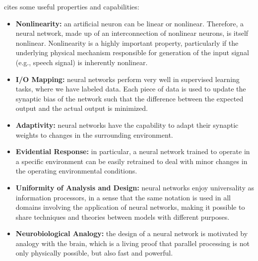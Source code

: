 \cite{haykin2009neural} cites some useful properties and capabilities:
\begin{itemize}
    \item \textbf{Nonlinearity:} an artificial neuron can be linear or nonlinear. Therefore, a neural network, made up of an interconnection of nonlinear neurons, is itself nonlinear. Nonlinearity is a highly important property, particularly if the underlying physical mechanism responsible for generation of the input signal (e.g., speech signal) is inherently nonlinear.
    \item \textbf{I/O Mapping:} neural networks perform very well in supervised learning tasks, where we have labeled data. Each piece of data is used to update the synaptic bias of the network such that the difference between the expected output and the actual output is minimized.
    \item \textbf{Adaptivity:} neural networks have the capability to adapt their synaptic weights to changes in the surrounding environment. 
    \item \textbf{Evidential Response:} in particular, a neural network trained to operate in a specific environment can be easily retrained to deal with minor changes in the operating environmental conditions.
    \item \textbf{Uniformity of Analysis and Design:} neural networks enjoy universality as information processors, in a sense that the same notation is used in all domains involving the application of neural networks, making it possible to share techniques and theories between models with different purposes.
    \item \textbf{Neurobiological Analogy:} the design of a neural network is motivated by analogy with the brain, which is a living proof that parallel processing is not only physically possible, but also fast and powerful.
\end{itemize}

